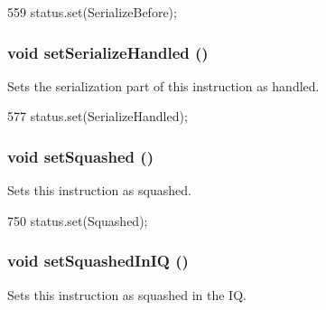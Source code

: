 \begin{DoxyCode}
559 { status.set(SerializeBefore); }
\end{DoxyCode}
\hypertarget{classBaseDynInst_ad115419b3ec6552a9db93ba349c73285}{
\subsubsection[{setSerializeHandled}]{\setlength{\rightskip}{0pt plus 5cm}void setSerializeHandled ()}}
\label{classBaseDynInst_ad115419b3ec6552a9db93ba349c73285}
Sets the serialization part of this instruction as handled. 


\begin{DoxyCode}
577 { status.set(SerializeHandled); }
\end{DoxyCode}
\hypertarget{classBaseDynInst_abfa7b30b342b5ef70b7e060b305a2f94}{
\subsubsection[{setSquashed}]{\setlength{\rightskip}{0pt plus 5cm}void setSquashed ()}}
\label{classBaseDynInst_abfa7b30b342b5ef70b7e060b305a2f94}
Sets this instruction as squashed. 


\begin{DoxyCode}
750 { status.set(Squashed); }
\end{DoxyCode}
\hypertarget{classBaseDynInst_ac9182e42b15715aae67ae9997da25082}{
\subsubsection[{setSquashedInIQ}]{\setlength{\rightskip}{0pt plus 5cm}void setSquashedInIQ ()}}
\label{classBaseDynInst_ac9182e42b15715aae67ae9997da25082}
Sets this instruction as squashed in the IQ. 


